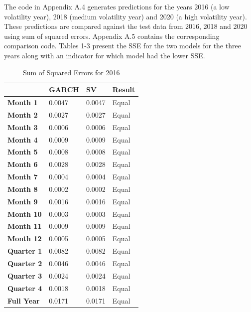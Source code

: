 \documentclass[12pt,letterpaper,reqno,fleqn]{article}
\begin{document}
The code in Appendix A.4 generates predictions for the years 2016 (a low volatility year), 2018 (medium volatility year) and 2020 (a high volatility year). These predictions are compared against the test data from 2016, 2018 and 2020 using sum of squared errors. Appendix A.5 contains the corresponding comparison code. Tables 1-3 present the SSE for the two models for the three years along with an indicator for which model had the lower SSE.

\begin{table}[!ht]
    \centering
    \begin{tabular}{|l|l|l|l|}
    \hline
        ~ & \textbf{GARCH} & \textbf{SV} & \textbf{Result} \\ \hline
        \textbf{Month 1 }& 0.0047 & 0.0047 & Equal \\ \hline
        \textbf{Month 2} & 0.0027 & 0.0027 & Equal \\ \hline
        \textbf{Month 3} & 0.0006 & 0.0006 & Equal \\ \hline
        \textbf{Month 4} & 0.0009 & 0.0009 & Equal \\ \hline
       \textbf{Month 5} & 0.0008 & 0.0008 & Equal \\ \hline
       \textbf{Month 6} & 0.0028 & 0.0028 & Equal \\ \hline
        \textbf{Month 7} & 0.0004 & 0.0004 & Equal \\ \hline
        \textbf{Month 8} & 0.0002 & 0.0002 & Equal \\ \hline
        \textbf{Month 9} & 0.0016 & 0.0016 & Equal \\ \hline
        \textbf{Month 10} & 0.0003 & 0.0003 & Equal \\ \hline
        \textbf{Month 11} & 0.0009 & 0.0009 & Equal \\ \hline
        \textbf{Month 12} & 0.0005 & 0.0005 & Equal \\ \hline
        \textbf{Quarter 1} & 0.0082 & 0.0082 & Equal \\ \hline
        \textbf{Quarter 2} & 0.0046 & 0.0046 & Equal \\ \hline
        \textbf{Quarter 3} & 0.0024 & 0.0024 & Equal \\ \hline
        \textbf{Quarter 4} & 0.0018 & 0.0018 & Equal \\ \hline
        \textbf{Full Year} & 0.0171 & 0.0171 & Equal \\ \hline
    \end{tabular}
\caption{Sum of Squared Errors for 2016}
\end{table}
\end{document}
